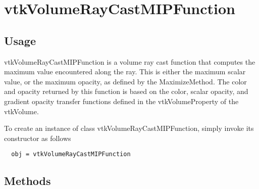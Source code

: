 \section{vtkVolumeRayCastMIPFunction}

\subsection{Usage}

 vtkVolumeRayCastMIPFunction is a volume ray cast function that
 computes the maximum value encountered along the ray. This is
 either the maximum scalar value, or the maximum opacity, as
 defined by the MaximizeMethod. The color and opacity returned
 by this function is based on the color, scalar opacity, and
 gradient opacity transfer functions defined in the vtkVolumeProperty
 of the vtkVolume.


To create an instance of class vtkVolumeRayCastMIPFunction, simply
invoke its constructor as follows
\begin{verbatim}
  obj = vtkVolumeRayCastMIPFunction
\end{verbatim}
\subsection{Methods}

